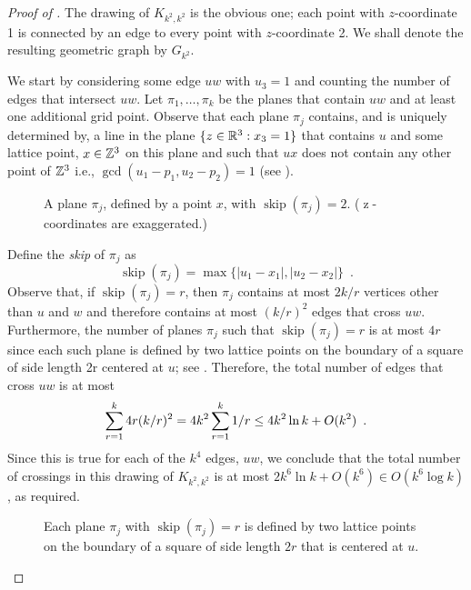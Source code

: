 \documentclass{patmorin}
\DeclareMathOperator{\z}{z}
\DeclareMathOperator{\skp}{skip}
\begin{document}
\begin{proof}[Proof of ]
  The drawing of $K_{k^2,k^2}$ is the obvious one; each point with
  $z$-coordinate 1 is connected by an edge to every point with
  $z$-coordinate 2.  We shall denote the resulting geometric graph
  by $G_{k^2}$.
  
  We start by considering some edge $uw$ with $u_3=1$ and counting the
  number of edges that intersect $uw$.  Let $\pi_1,\ldots,\pi_k$ be
  the planes that contain $uw$ and at least one additional grid point.
  Observe that each plane $\pi_j$ contains, and is uniquely determined
  by, a line in the plane $\{z\in\mathbb{R}^3: x_3=1\}$ that contains $u$ and
  some lattice point, $x\in\mathbb{Z}^3$ on this plane and such that $ux$ does
  not contain any other point of $\mathbb{Z}^3$ i.e., $\gcd(u_1-p_1,u_2-p_2)=1$
  (see ).
  \begin{figure}
    \caption{A plane $\pi_j$, defined by a point $x$, with
      $\skp(\pi_j)=2$. ($\z$-coordinates are exaggerated.)}
  \end{figure}
  Define the \emph{skip} of $\pi_j$ as
  \[
     \skp(\pi_j)=\max\{|u_1-x_1|,|u_2-x_2|\} \enspace .
  \]
  Observe that, if $\skp(\pi_j)=r$, then $\pi_j$ contains at most $2k/r$
  vertices other than $u$ and $w$ and therefore contains at most $(k/r)^2$
  edges that cross $uw$.  Furthermore, the number of planes $\pi_j$
  such that $\skp(\pi_j)=r$ is at most $4r$ since each such plane is
  defined by two lattice points on the boundary of a square of side
  length 2r centered at $u$; see .   Therefore,
  the total number of edges that cross $uw$ is at most
  \begin{equation}
     \sum_{r=1}^k 4r(k/r)^2 = 4k^2\sum_{r=1}^k 1/r 
       \le 4k^2\ln k + O(k^2) \enspace .
        \eqlabel{critical}
  \end{equation}
  Since this is true for each of the $k^4$ edges, $uw$, we conclude that
  the total number of crossings in this drawing of $K_{k^2,k^2}$ is at
  most $2k^6\ln k+O(k^6)\in O(k^6\log k)$, as required.
  \begin{figure}
    \caption{Each plane $\pi_j$ with $\skp(\pi_j)=r$ is defined by two 
      lattice points on the boundary of a square of side length $2r$ that
      is centered at $u$.}
  \end{figure}
\end{proof}
\end{document}
